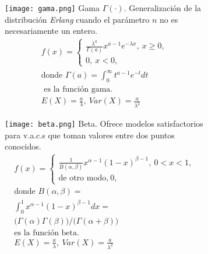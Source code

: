 \begin{figure}[H]
\begin{subfigure}[t]{.475\textwidth}\texttt{[image: gama.png]}
Gama $\Gamma(\cdot)$. Generalización de la distribución \emph{Erlang} cuando el parámetro $n$ no es necesariamente un entero.
\begin{equation}\begin{matrix}
f(x)=\begin{cases}\frac{\lambda^a}{\Gamma(a)}x^{a-1}e^{-\lambda x},\ x\geq 0,\\0,\ x<0,\end{cases}\\
\text{donde }\Gamma(a)=\int_{0}^{\infty}t^{a-1}e^{-t}dt\\\text{ es la función gama.}\\
E(X)=\frac{a}{\lambda},\ Var(X)=\frac{a}{\lambda^2}
\end{matrix}\end{equation}\end{subfigure}\qquad
\begin{subfigure}[t]{.475\textwidth}\texttt{[image: beta.png]}
Beta. Ofrece modelos satisfactorios para v.a.c.s que toman valores entre dos puntos conocidos.
\begin{equation}\begin{matrix}
f(x)=\begin{cases}\frac{1}{B(\alpha,\beta)}x^{\alpha-1}(1-x)^{\beta-1},\ 0<x<1,\\\text{de otro modo,}\ 0,\end{cases}\\
\text{donde } B(\alpha,\beta)=\\
\int_{0}^{1}x^{\alpha-1}(1-x)^{\beta-1}dx=\\
(\Gamma(\alpha)\Gamma(\beta)\big)/\big(\Gamma(\alpha+\beta)\big)\\
\text{es la función beta.}\\
E(X)=\frac{a}{\lambda},\ Var(X)=\frac{a}{\lambda^2}
\end{matrix}\end{equation}\end{subfigure}
\end{figure}